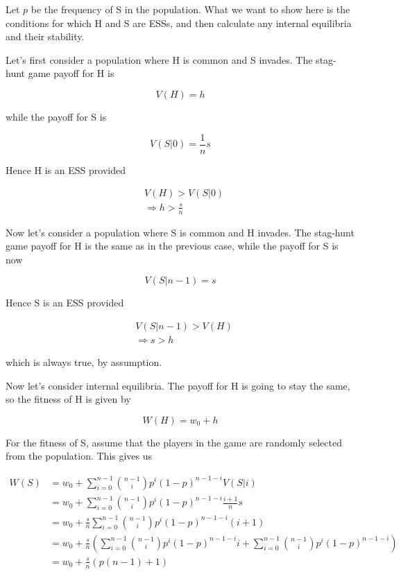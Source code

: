 \documentclass{article}
\begin{document}
Let $p$ be the frequency of S in the population. What we want to show
here is the conditions for which H and S are ESSs, and then calculate
any internal equilibria and their stability.

Let's first consider a population where H is common and S invades. The
stag-hunt game payoff for H is

\begin{equation*}
    V(H) = h
\end{equation*}

while the payoff for S is

\begin{equation*}
    V(S|0) = \frac{1}{n} s
\end{equation*}

Hence H is an ESS provided

\begin{align*}
    &V(H) > V(S|0) \\
    &\Rightarrow h > \frac{s}{n}
\end{align*}

Now let's consider a population where S is common and H invades. The
stag-hunt game payoff for H is the same as in the previous case, while
the payoff for S is now

\begin{equation*}
    V(S|n - 1) = s
\end{equation*}

Hence S is an ESS provided

\begin{align*}
    &V(S|n - 1) > V(H) \\
    &\Rightarrow s > h
\end{align*}

which is always true, by assumption.

Now let's consider internal equilibria. The payoff for H is going to
stay the same, so the fitness of H is given by

\begin{equation*}
    W(H) = w_0 + h
\end{equation*}

For the fitness of S, assume that the players in the game are randomly
selected from the population. This gives us

\begin{align*}
    W(S) &= w_0 + \sum_{i = 0}^{n - 1} \binom{n - 1}{i} p^i (1 - p)^{n - 1 - i} V(S|i) \\
         &= w_0 + \sum_{i = 0}^{n - 1} \binom{n - 1}{i} p^i (1 - p)^{n - 1 - i} \frac{i + 1}{n} s \\
         &= w_0 + \frac{s}{n} \sum_{i = 0}^{n - 1} \binom{n - 1}{i} p^i (1 - p)^{n - 1 - i} (i + 1) \\
         &= w_0 + \frac{s}{n} \left(\sum_{i = 0}^{n - 1} \binom{n - 1}{i} p^i (1 - p)^{n - 1 - i} i + \sum_{i = 0}^{n - 1} \binom{n - 1}{i} p^i (1 - p)^{n - 1 - i}\right) \\
         &= w_0 + \frac{s}{n} (p (n - 1) + 1)
\end{align*}
\end{document}
